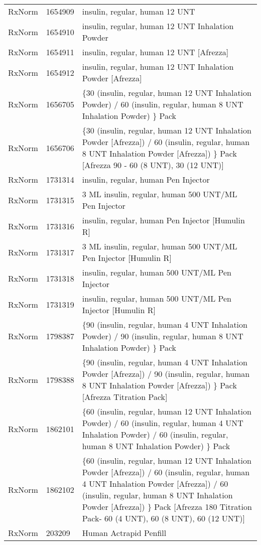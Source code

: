 \begin{longtable}{p{}p{}p{}}
  RxNorm & 1654909 & insulin, regular, human 12 UNT \\ 
  RxNorm & 1654910 & insulin, regular, human 12 UNT Inhalation Powder \\ 
  RxNorm & 1654911 & insulin, regular, human 12 UNT [Afrezza] \\ 
  RxNorm & 1654912 & insulin, regular, human 12 UNT Inhalation Powder [Afrezza] \\ 
  RxNorm & 1656705 & \{30 (insulin, regular, human 12 UNT Inhalation Powder) / 60 (insulin, regular, human 8 UNT Inhalation Powder) \} Pack \\ 
  RxNorm & 1656706 & \{30 (insulin, regular, human 12 UNT Inhalation Powder [Afrezza]) / 60 (insulin, regular, human 8 UNT Inhalation Powder [Afrezza]) \} Pack [Afrezza 90 - 60 (8 UNT), 30 (12 UNT)] \\ 
  RxNorm & 1731314 & insulin, regular, human Pen Injector \\ 
  RxNorm & 1731315 & 3 ML insulin, regular, human 500 UNT/ML Pen Injector \\ 
  RxNorm & 1731316 & insulin, regular, human Pen Injector [Humulin R] \\ 
  RxNorm & 1731317 & 3 ML insulin, regular, human 500 UNT/ML Pen Injector [Humulin R] \\ 
  RxNorm & 1731318 & insulin, regular, human 500 UNT/ML Pen Injector \\ 
  RxNorm & 1731319 & insulin, regular, human 500 UNT/ML Pen Injector [Humulin R] \\ 
  RxNorm & 1798387 & \{90 (insulin, regular, human 4 UNT Inhalation Powder) / 90 (insulin, regular, human 8 UNT Inhalation Powder) \} Pack \\ 
  RxNorm & 1798388 & \{90 (insulin, regular, human 4 UNT Inhalation Powder [Afrezza]) / 90 (insulin, regular, human 8 UNT Inhalation Powder [Afrezza]) \} Pack [Afrezza Titration Pack] \\ 
  RxNorm & 1862101 & \{60 (insulin, regular, human 12 UNT Inhalation Powder) / 60 (insulin, regular, human 4 UNT Inhalation Powder) / 60 (insulin, regular, human 8 UNT Inhalation Powder) \} Pack \\ 
  RxNorm & 1862102 & \{60 (insulin, regular, human 12 UNT Inhalation Powder [Afrezza]) / 60 (insulin, regular, human 4 UNT Inhalation Powder [Afrezza]) / 60 (insulin, regular, human 8 UNT Inhalation Powder [Afrezza]) \} Pack [Afrezza 180 Titration Pack- 60 (4 UNT), 60 (8 UNT), 60 (12 UNT)] \\ 
  RxNorm & 203209 & Human Actrapid Penfill \\ 

\end{longtable}
